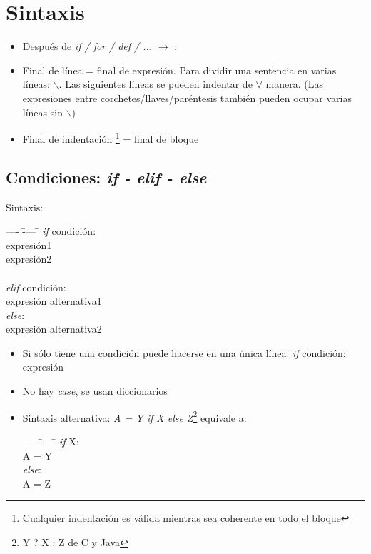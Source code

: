 \section{Sintaxis}

	\begin{itemize}
	\item Después de \textit{if / for / def / ...} $\rightarrow$ :
	\item Final de línea = final de expresión. Para dividir una sentencia en varias líneas: $\backslash$. Las siguientes líneas se pueden indentar de $\forall$ manera. (Las expresiones entre corchetes/llaves/paréntesis también pueden ocupar varias líneas sin  $\backslash$)  
	\item Final de indentación \footnote{Cualquier indentación es válida mientras sea coherente en todo el bloque} = final de bloque 
	\end{itemize}

	\subsection{Condiciones: \textit{if - elif - else}}
	\noindent Sintaxis:
	\begin{tabbing}
    ---- \= ---- \= \kill
	\> \textit{if} condición:\\
	\>\> expresión1 \\
	\>\> expresión2 \\ \\
	\>\textit{elif} condición: \\
	\>\> expresión alternativa1 \\
	\> \textit{else}: \\
	\>\> expresión alternativa2 
	\end{tabbing}

	\begin{itemize}
	\item Si sólo tiene una condición puede hacerse en una única línea: \textit{if} condición: expresión 	
	\item No hay \textit{case}, se usan diccionarios
	\item Sintaxis alternativa: \textit{A = Y if X else Z}\footnote{Y ? X : Z de C y Java} equivale a:
	\begin{tabbing}
    ---- \= ---- \= \kill
	\> \textit{if} X:\\
	\>\> A = Y\\
	\> \textit{else}: \\
	\>\> A = Z
	\end{tabbing}

	\end{itemize} 

